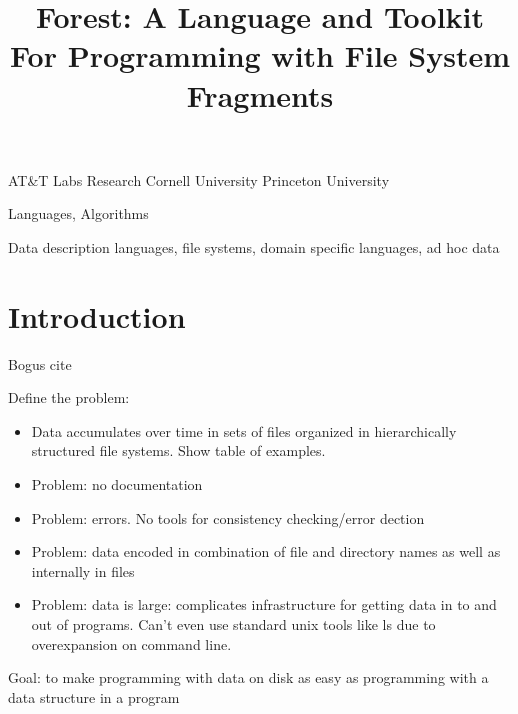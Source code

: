\documentclass[nocopyrightspace,natbib]{sigplanconf}
\begin{document}
\copyrightdata{} 

\title{Forest: A Language and Toolkit For Programming with File System Fragments}

	   {AT\&T Labs Research}
           {}
           {Cornell University}
           {}
           {Princeton University}
           {}



\maketitle{}

\begin{abstract}  

\end{abstract}


\terms
Languages, Algorithms

\keywords
Data description languages, file systems, domain specific languages, ad hoc data

\section {Introduction}
\label{sec:intro}

Bogus cite~\cite{fisher+:pads}

Define the problem:

\begin{itemize}
\item Data accumulates over time in sets of files organized in
hierarchically structured file systems.  Show table of examples.
\item Problem: no documentation
\item Problem: errors. No tools for consistency checking/error dection
\item Problem: data encoded in combination of file and directory names as
well as internally in files
\item Problem: data is large: complicates infrastructure for getting
  data in to and out of programs. Can't even use standard unix tools
  like ls due to overexpansion on command line.
\end{itemize}

Goal: to make programming with data on disk as easy as programming
with a data structure in a program
\end{document}
